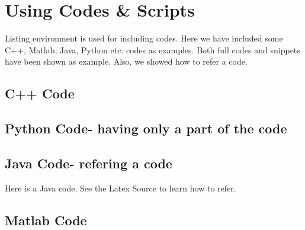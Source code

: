 \chapter{Using Codes \& Scripts}\label{chap:code}
Listing environment is used for including codes. Here we have included some C++, Matlab, Java, Python etc. codes as examples. Both full codes and snippets have been shown as example. Also, we showed how to refer a code.

\section{C++ Code}



\section{Python Code- having only a part of the code}



\section{Java Code- refering a code}
Here  is a Java code. See the Latex Source to learn how to refer.


\section{Matlab Code}


%
\endinput